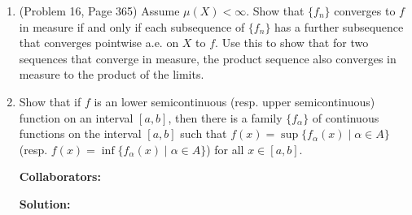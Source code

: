 \documentclass{article}%
\begin{document}
\begin{enumerate}
\item (Problem 16, Page 365) Assume $\mu (X) < \infty$.  Show that $\{f_n\}$ converges to $f$ in measure if and only if each  subsequence of $\{f_n\}$ has a further subsequence that converges pointwise a.e. on $X$ to $f$.  Use this to show that for two sequences that converge in measure, the product sequence also converges in measure to the product of the limits. 

\item Show that if $f$ is an lower semicontinuous (resp. upper semicontinuous) function on an interval $[a,b]$, then there is a family $\{f_{\alpha}\}$ of continuous functions on the interval $[a,b]$ such that $f(x) = \sup\{f_{\alpha}(x) \mid \alpha \in A \}$ (resp. $f(x) = \inf\{f_{\alpha}(x) \mid \alpha \in A \}$) for all $x \in [a,b]$.  


\bigskip
\textbf{Collaborators:}\\
\smallskip
 
\textbf{Solution:}
\bigskip






\end{enumerate}
\end{document}
